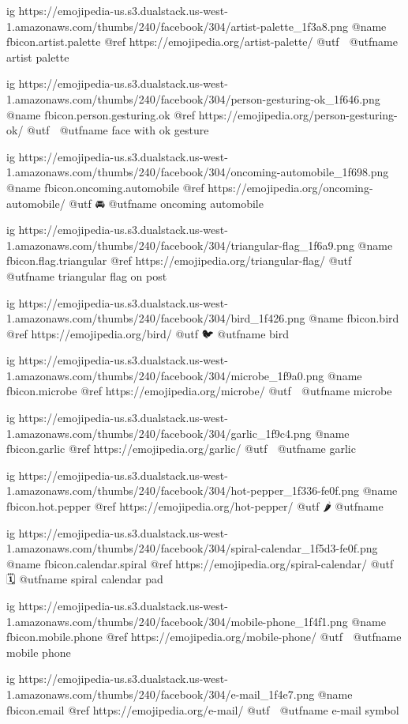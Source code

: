   ig https://emojipedia-us.s3.dualstack.us-west-1.amazonaws.com/thumbs/240/facebook/304/artist-palette_1f3a8.png
  @name fbicon.artist.palette
  @ref https://emojipedia.org/artist-palette/
  @utf 🎨
  @utfname artist palette

  ig https://emojipedia-us.s3.dualstack.us-west-1.amazonaws.com/thumbs/240/facebook/304/person-gesturing-ok_1f646.png
  @name fbicon.person.gesturing.ok
  @ref https://emojipedia.org/person-gesturing-ok/
  @utf 🙆
  @utfname face with ok gesture

  ig https://emojipedia-us.s3.dualstack.us-west-1.amazonaws.com/thumbs/240/facebook/304/oncoming-automobile_1f698.png
  @name fbicon.oncoming.automobile
  @ref https://emojipedia.org/oncoming-automobile/
  @utf 🚘
  @utfname oncoming automobile

  ig https://emojipedia-us.s3.dualstack.us-west-1.amazonaws.com/thumbs/240/facebook/304/triangular-flag_1f6a9.png
  @name fbicon.flag.triangular
  @ref https://emojipedia.org/triangular-flag/
  @utf 🚩
  @utfname triangular flag on post

  ig https://emojipedia-us.s3.dualstack.us-west-1.amazonaws.com/thumbs/240/facebook/304/bird_1f426.png
  @name fbicon.bird
  @ref https://emojipedia.org/bird/
  @utf 🐦
  @utfname bird

  ig https://emojipedia-us.s3.dualstack.us-west-1.amazonaws.com/thumbs/240/facebook/304/microbe_1f9a0.png
  @name fbicon.microbe
  @ref https://emojipedia.org/microbe/
  @utf 🦠
  @utfname microbe

  ig https://emojipedia-us.s3.dualstack.us-west-1.amazonaws.com/thumbs/240/facebook/304/garlic_1f9c4.png
  @name fbicon.garlic
  @ref https://emojipedia.org/garlic/
  @utf 🧄
  @utfname garlic

  ig https://emojipedia-us.s3.dualstack.us-west-1.amazonaws.com/thumbs/240/facebook/304/hot-pepper_1f336-fe0f.png
  @name fbicon.hot.pepper
  @ref https://emojipedia.org/hot-pepper/
  @utf 🌶️
  @utfname

  ig https://emojipedia-us.s3.dualstack.us-west-1.amazonaws.com/thumbs/240/facebook/304/spiral-calendar_1f5d3-fe0f.png
  @name fbicon.calendar.spiral
  @ref https://emojipedia.org/spiral-calendar/
  @utf 🗓
  @utfname spiral calendar pad

  ig https://emojipedia-us.s3.dualstack.us-west-1.amazonaws.com/thumbs/240/facebook/304/mobile-phone_1f4f1.png
  @name fbicon.mobile.phone
  @ref https://emojipedia.org/mobile-phone/
  @utf 📱
  @utfname mobile phone

  ig https://emojipedia-us.s3.dualstack.us-west-1.amazonaws.com/thumbs/240/facebook/304/e-mail_1f4e7.png
  @name fbicon.email
  @ref https://emojipedia.org/e-mail/
  @utf 📧
  @utfname e-mail symbol

